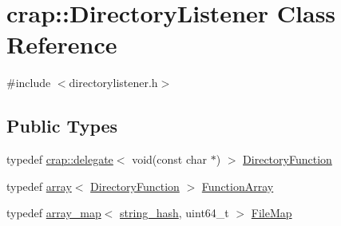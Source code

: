 \hypertarget{classcrap_1_1_directory_listener}{}\section{crap\+:\+:Directory\+Listener Class Reference}
\label{classcrap_1_1_directory_listener}


{\ttfamily \#include $<$directorylistener.\+h$>$}

\subsection*{Public Types}
\begin{DoxyCompactItemize}
\item 
typedef \hyperlink{classcrap_1_1delegate}{crap\+::delegate}$<$ void(const char $\ast$) $>$ \hyperlink{classcrap_1_1_directory_listener_a9a91cdc5d0463096540cc63b5bd05263}{Directory\+Function}
\item 
typedef \hyperlink{classcrap_1_1array}{array}$<$ \hyperlink{classcrap_1_1_directory_listener_a9a91cdc5d0463096540cc63b5bd05263}{Directory\+Function} $>$ \hyperlink{classcrap_1_1_directory_listener_a8a9545bc47aa34933aaf0b18713bd47f}{Function\+Array}
\item 
typedef \hyperlink{classcrap_1_1array__map}{array\+\_\+map}$<$ \hyperlink{classcrap_1_1string__hash}{string\+\_\+hash}, uint64\+\_\+t $>$ \hyperlink{classcrap_1_1_directory_listener_a6988f65f8f21698999b7ce9293f79c6d}{File\+Map}
\end{DoxyCompactItemize}
